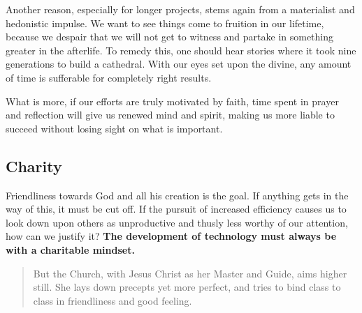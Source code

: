 \documentclass[letterpaper]{article}
\begin{document}
Another reason, especially for longer projects, stems again from a materialist and hedonistic impulse. We want to see things come to fruition in our lifetime, because we despair that we will not get to witness and partake in something greater in the afterlife. To remedy this, one should hear stories where it took nine generations to build a cathedral. With our eyes set upon the divine, any amount of time is sufferable for completely right results.

What is more, if our efforts are truly motivated by faith, time spent in prayer and reflection will give us renewed mind and spirit, making us more liable to succeed without losing sight on what is important.

\subsection{Charity}


Friendliness towards God and all his creation is the goal. If anything gets in the way of this, it must be cut off. If the pursuit of increased efficiency causes us to look down upon others as unproductive and thusly less worthy of our attention, how can we justify it? \textbf{The development of technology must always be with a charitable mindset.}

\begin{quote}
  But the Church, with Jesus Christ as her Master and Guide, aims higher still. She lays down precepts yet more perfect, and tries to bind class to class in friendliness and good feeling.
\end{quote}



\end{document}
